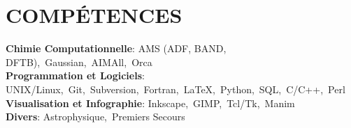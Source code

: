 \section{COMPÉTENCES}
\begin{itemize}[leftmargin=0in, label={}]
  \small{\item{
    \textbf{Chimie Computationnelle}\hspace{2pt}:\hspace{4pt}%
      AMS (ADF, BAND, DFTB),\ Gaussian,\ AIMAll,\ Orca
      \vspace{2pt}\\
    \textbf{Programmation et Logiciels}\hspace{2pt}:\hspace{4pt}%
      UNIX/Linux,\ Git,\ Subversion,\ Fortran,\ \LaTeX,\ Python,\ SQL,\ C/C++,\ Perl
      \vspace{2pt}\\
    \textbf{Visualisation et Infographie}\hspace{2pt}:\hspace{4pt}%
      Inkscape,\ GIMP,\ Tcl/Tk,\ Manim
      \vspace{2pt}\\
    \textbf{Divers}\hspace{2pt}:\hspace{4pt}%
      Astrophysique,\ Premiers Secours
  }}
\end{itemize}
